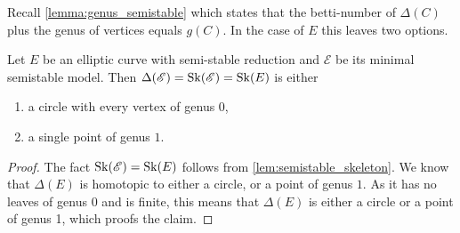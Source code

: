 Recall \cref{lemma:genus_semistable} which states that the betti-number of $\Delta(C)$ plus the genus of vertices equals $g(C)$. 
In the case of $E$ this leaves two options. 
\begin{lemma}
	Let $E$ be an elliptic curve with semi-stable reduction and $\mathscr E$ be its minimal semistable model. 
	Then $\Delta(\mathscr E) = \operatorname{Sk}(\mathscr E) = \operatorname{Sk}(E)$ is either 
	\begin{enumerate}
		\item a circle with every vertex of genus $0$,
		\item a single point of genus  $1$. 
	\end{enumerate}
\end{lemma}
\begin{proof}
	The fact $\operatorname{Sk}(\mathscr E) = \operatorname{Sk}(E)$ follows from \cref{lem:semistable_skeleton}. 
	We know that $\Delta(E)$ is homotopic to either a circle, or a point of genus $1$. 
	As it has no leaves of genus $0$ and is finite, this means that $\Delta(E)$ is either a circle or a point of genus 1, which proofs the claim.
\end{proof}



